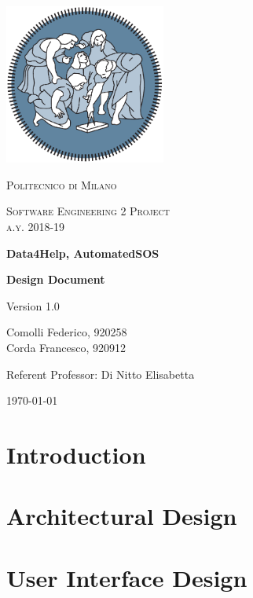 \documentclass{report}
\author{Federico Comolli
        \and
        Francesco Corda}
\date{October 2018}
\begin{document}
\begin{titlepage}
	\centering
	\includegraphics[width=150pt]{images/polimi_logo}\par\vspace{1cm}
	{\scshape\LARGE
		Politecnico di Milano\par}
	\vspace{1cm}
	{\scshape\Large
		Software Engineering 2 Project\\
		a.y. 2018-19\par}
	\vspace{1.5cm}
	{\huge\bfseries
		Data4Help, AutomatedSOS\\\par}
	{\Large\bfseries
		Design Document\par}
	Version 1.0\par
	\vspace{2cm}
	{\Large
		Comolli Federico, 920258\\
	    Corda Francesco, 920912\par}
	\vfill
	Referent Professor: Di Nitto Elisabetta\par
	\vfill
	{\large\today\par}
\end{titlepage}


\renewcommand{\contentsname}{Table of Contents}
\tableofcontents

\chapter{Introduction}


\chapter{Architectural Design}


\chapter{User Interface Design}

\end{document}
